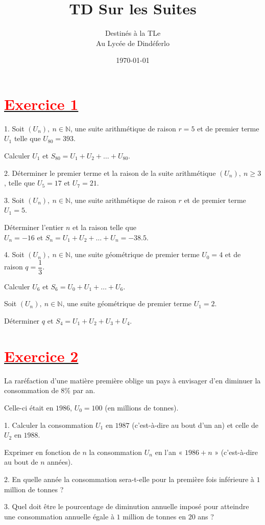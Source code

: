 \documentclass[12pt]{article}
\author{Destinés à la TLe\\Au Lycée de Dindéferlo}
\title{\textbf{TD Sur les Suites}}
\date{\today}
\begin{document}
\maketitle
\newpage
\section*{\underline{\textbf{\textcolor{red}{Exercice 1}}}}
1. Soit $\left(U_{n}\right),\ n\in\mathbb{N}$, une suite arithmétique de raison $r=5$ et de premier terme $U_{1}$ telle que $U_{80}=393$.
	
Calculer $U_{1}$ et $S_{80}=U_{1}+U_{2}+\ldots+U_{80}$.
	
2. Déterminer le premier terme et la raison de la suite arithmétique $\left(U_{n}\right),\ n\geq 3$, telle que $U_{5}=17$ et $U_{7}=21$.
	
3. Soit $\left(U_{n}\right),\ n\in\mathbb{N}$, une suite arithmétique de raison $r$ et de premier terme $U_{1}=5$.
	
Déterminer l'entier $n$ et la raison telle que\\ $U_{n}=-16$ et $S_{n}=U_{1}+U_{2}+\ldots+U_{n}=-38.5$.
	
4. Soit $\left(U_{n}\right),\ n\in\mathbb{N}$, une suite géométrique de premier terme $U_{0}=4$ et de raison $q=\dfrac{1}{3}$.
	
Calculer $U_{6}$ et $S_{6}=U_{0}+U_{1}+\ldots+U_{6}$.
	
Soit $\left(U_{n}\right),\ n\in\mathbb{N}$, une suite géométrique de premier terme $U_{1}=2$.
	
Déterminer $q$ et $S_{4}=U_{1}+U_{2}+U_{3}+U_{4}$.
\section*{\underline{\textbf{\textcolor{red}{Exercice 2}}}}
La raréfaction d'une matière première oblige un pays à envisager d'en diminuer la consommation de $8\%$ par an. 
	
Celle-ci était en $1986$, $U_{0}=100$ (en millions de tonnes).
	
1. Calculer la consommation $U_{1}$ en $1987$ (c'est-à-dire au bout d'un an) et celle de $U_{2}$ en $1988$.
	
Exprimer en fonction de $n$ la consommation $U_{n}$ en l'an « $1986+n$ » (c'est-à-dire au bout de $n$ années).

2. En quelle année la consommation sera-t-elle pour la première fois inférieure à $1$ million de tonnes ?
	
3. Quel doit être le pourcentage de diminution annuelle imposé pour atteindre une consommation annuelle égale à $1$ million de tonnes en $20$ ans ?
\end{document}
